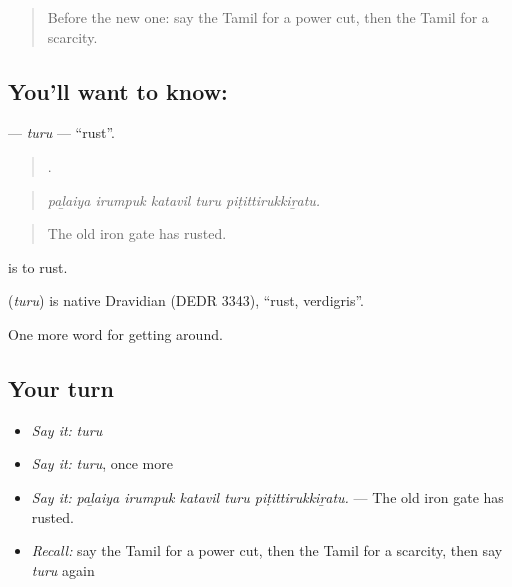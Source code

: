 \label{lesson:TA-C445-turu-rust}



\begin{quote}
Before the new one: say the Tamil for a power cut, then the Tamil for a scarcity.
\end{quote}

\subsection*{You'll want to know: }
\textbf{} — \emph{turu} — \textquotedblleft{}rust\textquotedblright{}.

\begin{quote}
    .
\end{quote}

\begin{quote}
\emph{paḻaiya irumpuk katavil turu piṭittirukkiṟatu.}
\end{quote}

\begin{quote}
The old iron gate has rusted.
\end{quote}

  is to rust.

\begin{cousinweb}
\textbf{} (\emph{turu}) is native Dravidian (DEDR 3343), \textquotedblleft{}rust, verdigris\textquotedblright{}.
\end{cousinweb}

\begin{grammarlens}[title={What you've built}]
One more word for getting around.
\end{grammarlens}

\subsection*{Your turn}
\begin{itemize}
\raggedright
  \item \emph{Say it:} \emph{turu}
  \item \emph{Say it:} \emph{turu}, once more
  \item \emph{Say it:} \emph{paḻaiya irumpuk katavil turu piṭittirukkiṟatu.} — The old iron gate has rusted.
  \item \emph{Recall:} say the Tamil for a power cut, then the Tamil for a scarcity, then say \emph{turu} again
\end{itemize}


